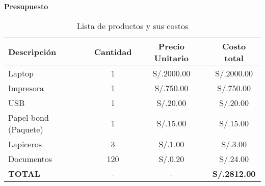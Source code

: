 \begin{presupuesto}
\textbf{\Large{Presupuesto}}

\begin{table}[h!]
    \caption{Lista de productos y sus costos}
    \begin{tabular}{|l|c|c|c|}
        \hline
        \textbf{Descripción} & \textbf{Cantidad} & \textbf{Precio Unitario} & \textbf{Costo total} \\
        \hline
        Laptop & 1 & S/.2000.00 & S/.2000.00 \\
        \hline
        Impresora & 1 & S/.750.00 & S/.750.00 \\
        \hline
        USB & 1 & S/.20.00 & S/.20.00 \\
        \hline
        Papel bond (Paquete) & 1 & S/.15.00 & S/.15.00 \\
        \hline
        Lapiceros & 3 & S/.1.00 & S/.3.00 \\
        \hline
        Documentos & 120 & S/.0.20 & S/.24.00 \\
        \hline
        \textbf{TOTAL} & - & - & \textbf{S/.2812.00} \\
        \hline
    \end{tabular}
    
\end{table}

\end{presupuesto}